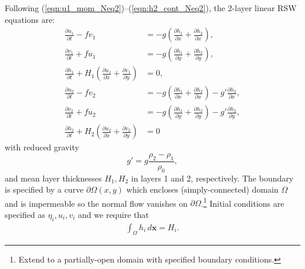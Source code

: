 \documentclass[10pt,reqno]{amsart}
\newcommand{\x}{{\mathbf x}}
\begin{document}
Following (\ref{eqn:u1_mom_Neq2})--(\ref{eqn:h2_cont_Neq2}), the 2-layer linear RSW equations are:
\begin{align}
\frac{\partial u_1}{\partial t }  - f v_1 &= -g \left( \frac{\partial h_1}{\partial x} + \frac{\partial h_2}{\partial x} \right) , \nonumber   \\
\frac{\partial v_1}{\partial t }  +f u_1 &= -g \left( \frac{\partial h_1}{\partial y} + \frac{\partial h_2}{\partial y} \right) , \nonumber   \\
\frac{\partial h_1}{\partial t }  + H_1 \left( \frac{\partial u_1}{\partial x} + \frac{\partial v_1}{\partial y} \right) &= 0  , \nonumber \\
\frac{\partial u_2}{\partial t }  - f v_2 &= -g \left( \frac{\partial h_1}{\partial x} + \frac{\partial h_2}{\partial x} \right)  - g' \frac{\partial h_2}{\partial x} , \nonumber  \\
\frac{\partial v_2}{\partial t }  +f u_2 &= -g \left( \frac{\partial h_1}{\partial y} + \frac{\partial h_2}{\partial y} \right)  - g' \frac{\partial h_2}{\partial y} , \nonumber  \\
\frac{\partial h_2}{\partial t }  + H_2 \left( \frac{\partial u_2}{\partial x} + \frac{\partial v_2}{\partial y} \right) &= 0   
\label{eqn:2layer_coupled_linear_RSW}
\end{align}
with reduced gravity
\begin{equation}
g' = g \frac{\rho_2 - \rho_1}{\rho_0}  ,
\end{equation}
and mean layer thicknesses $H_1, H_2$ in layers 1 and 2, respectively.
The boundary is specified by a curve ${\partial \Omega}(x,y)$ which encloses (simply-connected) domain $\Omega$ and is impermeable so the normal flow vanishes on ${\partial \Omega}$.\footnote{Extend to a partially-open domain with specified boundary conditions.}
Initial conditions are specified as $\eta_i, u_i, v_i$ and we require that 
\begin{align}
\int_\Omega h_i \, d \x = H_i .
\end{align}
\end{document}

